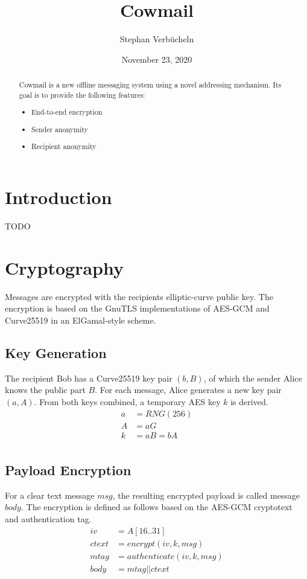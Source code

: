 \documentclass[a4paper]{article}
\title{Cowmail}
\author{Stephan Verbücheln}
\date{November 23, 2020}
\begin{document}
\maketitle


\begin{abstract}
Cowmail is a new offline messaging system using a novel addressing mechanism.
Its goal is to provide the following features:
\begin{itemize}
\item End-to-end encryption
\item Sender anonymity
\item Recipient anonymity
\end{itemize}
\end{abstract}

\section{Introduction}
TODO

\section{Cryptography}
Messages are encrypted with the recipients elliptic-curve public key. The
encryption is based on the GnuTLS implementations of AES-GCM and Curve25519 in
an ElGamal-style scheme.

\subsection{Key Generation}
The recipient Bob has a Curve25519 key pair $(b, B)$, of which the sender Alice
knows the public part $B$. For each message, Alice generates a new key pair
$(a, A)$. From both keys combined, a temporary AES key $k$ is derived.
\begin{align*}
a &= RNG(256) \\
A &= a G \\
k &= a B = b A \\
\end{align*}

\subsection{Payload Encryption}
For a clear text message $msg$, the resulting encrypted payload is called
message $body$. The encryption is defined as follows based on the AES-GCM
cryptotext and authentication tag.
\begin{align*}
iv    &= A[16..31] \\
ctext &= encrypt(iv, k, msg) \\
mtag  &= authenticate(iv, k, msg) \\
body  &= mtag || ctext
\end{align*}
\end{document}

